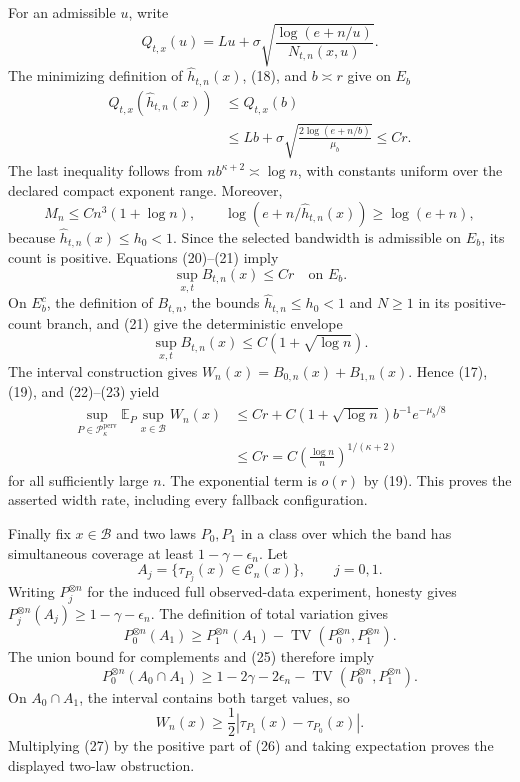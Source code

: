 For an admissible \(u\), write
\[
 Q_{t,x}(u)=Lu+\sigma\sqrt{\frac{\log(e+n/u)}{N_{t,n}(x,u)}}.
\]
The minimizing definition of \(\widehat h_{t,n}(x)\), (18), and \(b\asymp r\) give on \(E_b\)
\[
\begin{aligned}
 Q_{t,x}(\widehat h_{t,n}(x))
 &\le Q_{t,x}(b)\\
 &\le Lb+\sigma\sqrt{\frac{2\log(e+n/b)}{\mu_b}}
 \le Cr. \tag{20}
\end{aligned}
\]
The last inequality follows from \(nb^{\kappa+2}\asymp\log n\), with constants uniform over the declared compact exponent range.  Moreover,
\[
 M_n\le Cn^3(1+\log n),
 \qquad
 \log(e+n/\widehat h_{t,n}(x))\ge\log(e+n), \tag{21}
\]
because \(\widehat h_{t,n}(x)\le h_0<1\).  Since the selected bandwidth is admissible on \(E_b\), its count is positive.  Equations (20)--(21) imply
\[
 \sup_{x,t}B_{t,n}(x)\le Cr \quad\text{on }E_b. \tag{22}
\]
On \(E_b^c\), the definition of \(B_{t,n}\), the bounds \(\widehat h_{t,n}\le h_0<1\) and \(N\ge1\) in its positive-count branch, and (21) give the deterministic envelope
\[
 \sup_{x,t}B_{t,n}(x)\le C(1+\sqrt{\log n}). \tag{23}
\]
The interval construction gives \(W_n(x)=B_{0,n}(x)+B_{1,n}(x)\).  Hence (17), (19), and (22)--(23) yield
\[
\begin{aligned}
 \sup_{P\in\mathcal P_\kappa^{\mathrm{perv}}}
 \mathbb E_P\sup_{x\in\mathcal B}W_n(x)
 &\le Cr+C(1+\sqrt{\log n})b^{-1}e^{-\mu_b/8}\\
 &\le Cr
 =C\left(\frac{\log n}{n}\right)^{1/(\kappa+2)} \tag{24}
\end{aligned}
\]
for all sufficiently large \(n\).  The exponential term is \(o(r)\) by (19).  This proves the asserted width rate, including every fallback configuration.

Finally fix \(x\in\mathcal B\) and two laws \(P_0,P_1\) in a class over which the band has simultaneous coverage at least \(1-\gamma-\epsilon_n\).  Let
\[
 A_j=\{\tau_{P_j}(x)\in\mathcal C_n(x)\},\qquad j=0,1.
\]
Writing \(P_j^{\otimes n}\) for the induced full observed-data experiment, honesty gives \(P_j^{\otimes n}(A_j)\ge1-\gamma-\epsilon_n\).  The definition of total variation gives
\[
 P_0^{\otimes n}(A_1)
 \ge P_1^{\otimes n}(A_1)-
 \operatorname{TV}(P_0^{\otimes n},P_1^{\otimes n}). \tag{25}
\]
The union bound for complements and (25) therefore imply
\[
 P_0^{\otimes n}(A_0\cap A_1)
 \ge1-2\gamma-2\epsilon_n-
 \operatorname{TV}(P_0^{\otimes n},P_1^{\otimes n}). \tag{26}
\]
On \(A_0\cap A_1\), the interval contains both target values, so
\[
 W_n(x)\ge\frac12|\tau_{P_1}(x)-\tau_{P_0}(x)|. \tag{27}
\]
Multiplying (27) by the positive part of (26) and taking expectation proves the displayed two-law obstruction.

